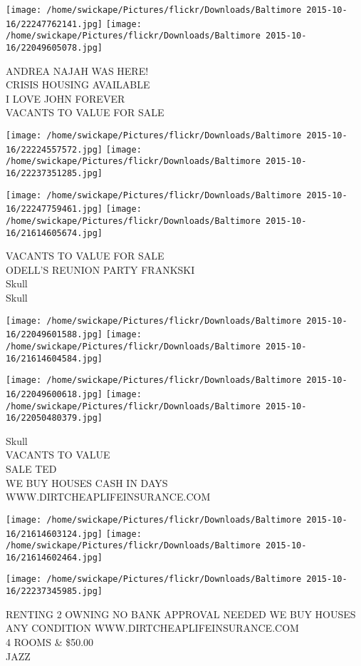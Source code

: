 \documentclass[10pt,letterpaper]{article}
\begin{document}
\texttt{[image: /home/swickape/Pictures/flickr/Downloads/Baltimore 2015-10-16/22247762141.jpg]}
\texttt{[image: /home/swickape/Pictures/flickr/Downloads/Baltimore 2015-10-16/22049605078.jpg]}

ANDREA NAJAH WAS HERE!\\
CRISIS HOUSING AVAILABLE\\
I LOVE JOHN FOREVER\\
VACANTS TO VALUE FOR SALE
\pagebreak

\texttt{[image: /home/swickape/Pictures/flickr/Downloads/Baltimore 2015-10-16/22224557572.jpg]}
\texttt{[image: /home/swickape/Pictures/flickr/Downloads/Baltimore 2015-10-16/22237351285.jpg]}

\texttt{[image: /home/swickape/Pictures/flickr/Downloads/Baltimore 2015-10-16/22247759461.jpg]}
\texttt{[image: /home/swickape/Pictures/flickr/Downloads/Baltimore 2015-10-16/21614605674.jpg]}

VACANTS TO VALUE FOR SALE\\
ODELL'S REUNION PARTY FRANKSKI\\
Skull\\
Skull
\pagebreak

\texttt{[image: /home/swickape/Pictures/flickr/Downloads/Baltimore 2015-10-16/22049601588.jpg]}
\texttt{[image: /home/swickape/Pictures/flickr/Downloads/Baltimore 2015-10-16/21614604584.jpg]}

\texttt{[image: /home/swickape/Pictures/flickr/Downloads/Baltimore 2015-10-16/22049600618.jpg]}
\texttt{[image: /home/swickape/Pictures/flickr/Downloads/Baltimore 2015-10-16/22050480379.jpg]}

Skull\\
VACANTS TO VALUE\\
SALE TED\\
WE BUY HOUSES CASH IN DAYS WWW.DIRTCHEAPLIFEINSURANCE.COM
\pagebreak

\texttt{[image: /home/swickape/Pictures/flickr/Downloads/Baltimore 2015-10-16/21614603124.jpg]}
\texttt{[image: /home/swickape/Pictures/flickr/Downloads/Baltimore 2015-10-16/21614602464.jpg]}

\texttt{[image: /home/swickape/Pictures/flickr/Downloads/Baltimore 2015-10-16/22237345985.jpg]}

RENTING 2 OWNING NO BANK APPROVAL NEEDED WE BUY HOUSES ANY CONDITION WWW.DIRTCHEAPLIFEINSURANCE.COM\\
4 ROOMS \& \$50.00\\
JAZZ
\pagebreak
\end{document}
